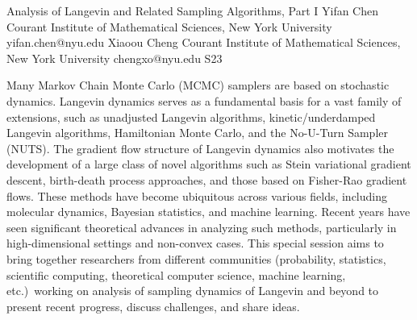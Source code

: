 

\clearpage

\begin{session}
 {Analysis of Langevin and Related Sampling Algorithms, Part I}%
 {Yifan Chen}%
 {Courant Institute of Mathematical Sciences, New York University}%
 {yifan.chen@nyu.edu}%
 {Xiaoou Cheng}%
 {Courant Institute of Mathematical Sciences, New York University}%
 {chengxo@nyu.edu}%
 {S23}%
 {}%

 {}
 Many Markov Chain Monte Carlo (MCMC) samplers are based on stochastic dynamics. Langevin dynamics serves as a fundamental basis for a vast family of extensions, such as unadjusted Langevin algorithms, kinetic/underdamped Langevin algorithms, Hamiltonian Monte Carlo, and the No-U-Turn Sampler (NUTS). The gradient flow structure of Langevin dynamics also motivates the development of a large class of novel algorithms such as Stein variational gradient descent, birth-death process approaches, and those based on Fisher-Rao gradient flows. These methods have become ubiquitous across various fields, including molecular dynamics, Bayesian statistics, and machine learning. Recent years have seen significant theoretical advances in analyzing such methods, particularly in high-dimensional settings and non-convex cases. This special session aims to bring together researchers from different communities (probability, statistics, scientific computing, theoretical computer science, machine learning, etc.)\ working on analysis of sampling dynamics of Langevin and beyond to present recent progress, discuss challenges, and share ideas.
\end{session}



\clearpage

